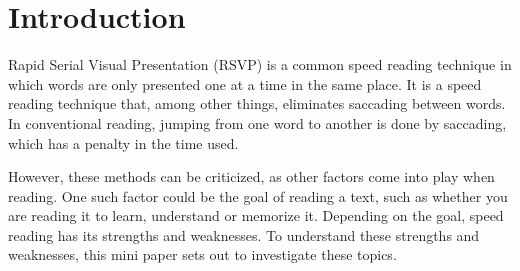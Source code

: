\section{Introduction}
Rapid Serial Visual Presentation (RSVP) is a common speed reading technique in which words are only presented one at a time in the same place. It is a speed reading technique that, among other things, eliminates saccading between words. In conventional reading, jumping from one word to another is done by saccading, which has a penalty in the time used.

However, these methods can be criticized, as other factors come into play when reading. One such factor could be the goal of reading a text, such as whether you are reading it to learn, understand or memorize it. Depending on the goal, speed reading has its strengths and weaknesses. To understand these strengths and weaknesses, this mini paper sets out to investigate these topics.